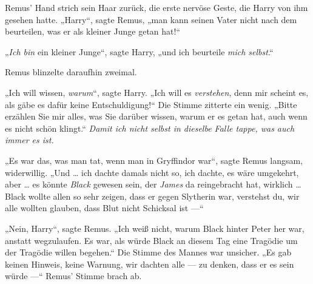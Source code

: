 Remus’ Hand strich sein Haar zurück, die erste nervöse Geste, die Harry von ihm gesehen hatte.
„Harry“, sagte Remus, „man kann seinen Vater nicht nach dem beurteilen, was er als kleiner Junge getan hat!“

„\emph{Ich bin} ein kleiner Junge“, sagte Harry, „und ich beurteile \emph{mich selbst}.“

Remus blinzelte daraufhin zweimal.

„Ich will wissen, \emph{warum}“, sagte Harry.
„Ich will es \emph{verstehen}, denn mir scheint es, als gäbe es dafür keine Entschuldigung!“ Die Stimme zitterte ein wenig.
„Bitte erzählen Sie mir alles, was Sie darüber wissen, warum er es getan hat, auch wenn es nicht schön klingt.“ \emph{Damit ich nicht selbst in dieselbe Falle tappe, was auch immer es ist.}

„Es war das, was man tat, wenn man in Gryffindor war“, sagte Remus langsam, widerwillig.
„Und … ich dachte damals nicht so, ich dachte, es wäre umgekehrt, aber … es könnte \emph{Black} gewesen sein, der \emph{James} da reingebracht hat, wirklich … Black wollte allen so sehr zeigen, dass er gegen Slytherin war, verstehst du, wir alle wollten glauben, dass Blut nicht Schicksal ist —“

\later

„Nein, Harry“, sagte Remus.
„Ich weiß nicht, warum Black hinter Peter her war, anstatt wegzulaufen. Es war, als würde Black an diesem Tag eine Tragödie um der Tragödie willen begehen.“ Die Stimme des Mannes war unsicher.
„Es gab keinen Hinweis, keine Warnung, wir dachten alle — zu denken, dass er es sein würde —“ Remus’ Stimme brach ab.

